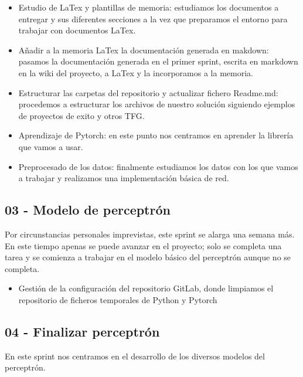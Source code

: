\begin{itemize}
    \item Estudio de LaTex y plantillas de memoria: estudiamos los documentos a entregar y sus diferentes secciones a la vez que preparamos el entorno para trabajar con documentos LaTex.
    \item Añadir a la memoria LaTex la documentación generada en makdown: pasamos la documentación generada en el primer sprint, escrita en markdown en la wiki del proyecto, a LaTex y la incorporamos a la memoria.
    \item Estructurar las carpetas del repositorio y actualizar fichero Readme.md: procedemos a estructurar los archivos de nuestro solución siguiendo ejemplos de proyectos de exito y otros TFG.
    \item Aprendizaje de Pytorch: en este punto nos centramos en aprender la librería que vamos a usar.
    \item Preprocesado de los datos: finalmente estudiamos los datos con los que vamos a trabajar y realizamos una implementación básica de red.
\end{itemize}


\subsection{03 - Modelo de perceptrón \newline
[16/03/2020 - 06/04/2020]}

Por circunstancias personales imprevistas, este sprint se alarga una semana más. En este tiempo apenas se puede avanzar en el proyecto; solo se completa una tarea y se comienza a trabajar en el modelo básico del perceptrón aunque no se completa.

\begin{itemize}
    \item Gestión de la configuración del repositorio GitLab, donde limpiamos el repositorio de ficheros temporales de Python y Pytorch
\end{itemize}


\subsection{04 - Finalizar perceptrón \newline
[07/04/2020 - 20/04/2020]}

En este sprint nos centramos en el desarrollo de los diversos modelos del perceptrón.

